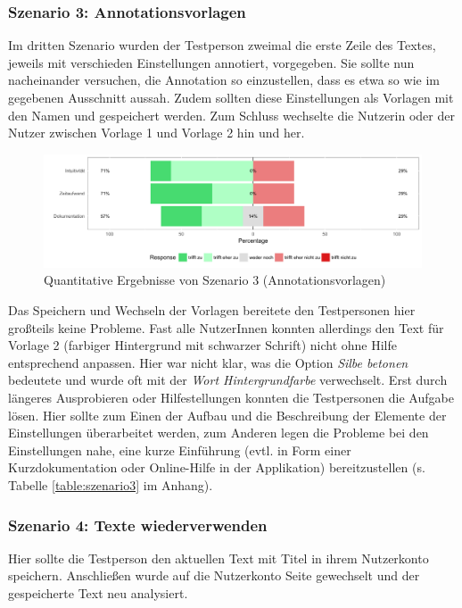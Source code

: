 \subsubsection{Szenario 3: Annotationsvorlagen}

Im dritten Szenario wurden der Testperson zweimal die erste Zeile des Textes, jeweils mit verschieden Einstellungen annotiert, vorgegeben. Sie sollte nun nacheinander versuchen, die Annotation so einzustellen, dass es etwa so wie im gegebenen Ausschnitt aussah. Zudem sollten diese Einstellungen als Vorlagen mit den Namen  und  gespeichert werden. Zum Schluss wechselte die Nutzerin oder der Nutzer zwischen Vorlage 1 und Vorlage 2 hin und her.

\begin{figure}[h!]
	\centering
	\includegraphics[width=.8\linewidth]{figures/evaluation/scenario3}
	\caption{Quantitative Ergebnisse von Szenario 3 (Annotationsvorlagen)}
	\label{fig:evaluation-sc3}
\end{figure}

Das Speichern und Wechseln der Vorlagen bereitete den Testpersonen hier großteils keine Probleme. Fast alle NutzerInnen konnten allerdings den Text für Vorlage 2 (farbiger Hintergrund mit schwarzer Schrift) nicht ohne Hilfe entsprechend anpassen. Hier war nicht klar, was die Option \textit{Silbe betonen} bedeutete und wurde oft mit der \textit{Wort Hintergrundfarbe} verwechselt. Erst durch längeres Ausprobieren oder Hilfestellungen konnten die Testpersonen die Aufgabe lösen. Hier sollte zum Einen der Aufbau und die Beschreibung der Elemente der Einstellungen überarbeitet werden, zum Anderen legen die Probleme bei den Einstellungen nahe, eine kurze Einführung (evtl. in Form einer Kurzdokumentation oder Online-Hilfe in der Applikation) bereitzustellen (s. Tabelle \ref{table:szenario3} im Anhang).

\subsubsection{Szenario 4: Texte wiederverwenden}

Hier sollte die Testperson den aktuellen Text mit Titel in ihrem Nutzerkonto speichern. Anschließen wurde auf die Nutzerkonto Seite gewechselt und der gespeicherte Text neu analysiert.

